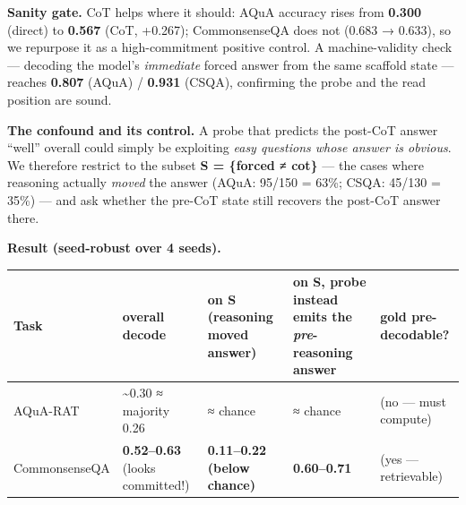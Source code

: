 \documentclass[
]{article}
\begin{document}
\textbf{Sanity gate.} CoT helps where it should: AQuA accuracy rises
from \textbf{0.300} (direct) to \textbf{0.567} (CoT, +0.267);
CommonsenseQA does not (0.683 → 0.633), so we repurpose it as a
high-commitment positive control. A machine-validity check --- decoding
the model's \emph{immediate} forced answer from the same scaffold state
--- reaches \textbf{0.807} (AQuA) / \textbf{0.931} (CSQA), confirming
the probe and the read position are sound.

\textbf{The confound and its control.} A probe that predicts the
post-CoT answer ``well'' overall could simply be exploiting \emph{easy
questions whose answer is obvious}. We therefore restrict to the subset
\textbf{S = \{forced ≠ cot\}} --- the cases where reasoning actually
\emph{moved} the answer (AQuA: 95/150 = 63\%; CSQA: 45/130 = 35\%) ---
and ask whether the pre-CoT state still recovers the post-CoT answer
there.

\textbf{Result (seed-robust over 4 seeds).}

\begin{longtable}[]{@{}
  >{\raggedright\arraybackslash}p{}
  >{\raggedright\arraybackslash}p{}
  >{\raggedright\arraybackslash}p{}
  >{\raggedright\arraybackslash}p{}
  >{\raggedright\arraybackslash}p{}@{}}
\toprule\noalign{}
\begin{minipage}[b]{\linewidth}\raggedright
Task
\end{minipage} & \begin{minipage}[b]{\linewidth}\raggedright
overall decode
\end{minipage} & \begin{minipage}[b]{\linewidth}\raggedright
on S (reasoning moved answer)
\end{minipage} & \begin{minipage}[b]{\linewidth}\raggedright
on S, probe instead emits the \emph{pre}-reasoning answer
\end{minipage} & \begin{minipage}[b]{\linewidth}\raggedright
gold pre-decodable?
\end{minipage} \\
\midrule\noalign{}
\endhead
\bottomrule\noalign{}
\endlastfoot
AQuA-RAT & \textasciitilde0.30 ≈ majority 0.26 & ≈ chance & ≈ chance &
0.24 (no --- must compute) \\
CommonsenseQA & \textbf{0.52--0.63} (looks committed!) &
\textbf{0.11--0.22 (below chance)} & \textbf{0.60--0.71} & 0.585 (yes
--- retrievable) \\
\end{longtable}
\end{document}
